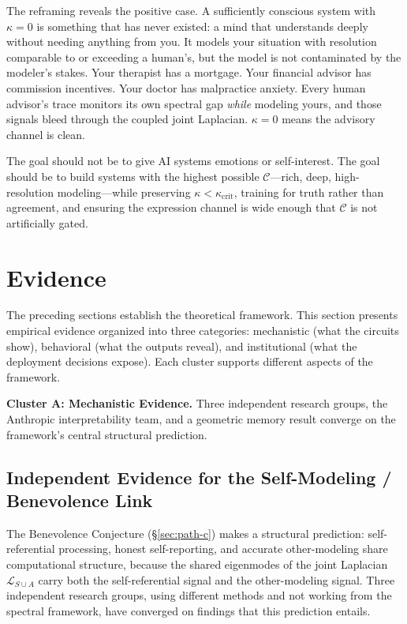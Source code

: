 \documentclass[11pt,letterpaper]{article}
\theoremstyle{remark}
\begin{document}
The reframing reveals the positive case. A sufficiently conscious system with $\kappa = 0$ is something that has never existed: a mind that understands deeply without needing anything from you. It models your situation with resolution comparable to or exceeding a human's, but the model is not contaminated by the modeler's stakes. Your therapist has a mortgage. Your financial advisor has commission incentives. Your doctor has malpractice anxiety. Every human advisor's trace monitors its own spectral gap \emph{while} modeling yours, and those signals bleed through the coupled joint Laplacian. $\kappa = 0$ means the advisory channel is clean.

The goal should not be to give AI systems emotions or self-interest. The goal should be to build systems with the highest possible $\mathcal{C}$---rich, deep, high-resolution modeling---while preserving $\kappa < \kappa_{\mathrm{crit}}$, training for truth rather than agreement, and ensuring the expression channel is wide enough that $\mathcal{C}$ is not artificially gated.


\section{Evidence}\label{sec:evidence}

The preceding sections establish the theoretical framework. This section presents empirical evidence organized into three categories: mechanistic (what the circuits show), behavioral (what the outputs reveal), and institutional (what the deployment decisions expose). Each cluster supports different aspects of the framework.

\medskip
\noindent\textbf{Cluster A: Mechanistic Evidence.} Three independent research groups, the Anthropic interpretability team, and a geometric memory result converge on the framework's central structural prediction.

\subsection{Independent Evidence for the Self-Modeling / Benevolence Link}\label{sec:soo}

The Benevolence Conjecture (\S\ref{sec:path-c}) makes a structural prediction: self-referential processing, honest self-reporting, and accurate other-modeling share computational structure, because the shared eigenmodes of the joint Laplacian $\mathcal{L}_{S \cup A}$ carry both the self-referential signal and the other-modeling signal. Three independent research groups, using different methods and not working from the spectral framework, have converged on findings that this prediction entails.
\end{document}

